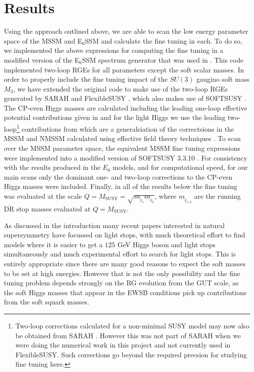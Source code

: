 \documentclass[preprint,amsmath,amssymb,aps,superscriptaddress,prd,
showpacs,floatfix,nofootinbib]{revtex4-1}
\begin{document}
\section{\label{sec:results}Results}

Using the approach outlined above, we are able to scan the low energy
parameter space of the MSSM and E$_6$SSM and calculate the fine tuning
in each.  To do so, we implemented the above expressions for computing
the fine tuning in a modified version of the E$_6$SSM spectrum
generator that was used in \cite{Athron:2013ipa}.  This code
implemented two-loop RGEs for all parameters except the soft scalar
masses.  In order to properly include the fine tuning impact of the
$SU(3)$ gaugino soft mass $M_3$, we have extended the original code to
make use of the two-loop RGEs generated by SARAH \cite{Staub:2009bi,
  Staub:2010jh, Staub:2012pb, Staub:2013tta} and FlexibleSUSY
\cite{Athron:2014yba}, which also makes use of SOFTSUSY
\cite{Allanach:2001kg, Allanach:2013kza}.  The CP-even Higgs masses
are calculated including the leading one-loop effective potential
contributions given in \cite{Athron:2009bs} and for the light Higgs we
use the leading two-loop\footnote{Two-loop corrections calculated for
  a non-minimal SUSY model may now also be obtained from SARAH
  \cite{Goodsell:2014pla,Goodsell:2015ira}.  However this was not part
  of SARAH when we were doing the numerical work in this project and
  not currently used in FlexibleSUSY.  Such corrections go beyond the
  required precsion for studying fine tuning here.} contributions from \cite{King:2005jy} which
are a generalsiation of the correctsions in the MSSM and NMSSM
calculated using effective field theory techniques
\cite{Carena:1995wu,Ellwanger:1999ji}.  To scan over the MSSM
parameter space, the equivalent MSSM fine tuning expressions were
implemented into a modified version of SOFTSUSY 3.3.10
\cite{Allanach:2001kg}.  For consistency with the results produced in
the $E_6$ models, and for computational speed, for our main scans only
the dominant one- and two-loop corrections to the CP-even Higgs masses
were included.  Finally, in all of the results below the fine tuning
was evaluated at the scale $Q = M_{\textrm{SUSY}} =
\sqrt{m_{\tilde{t}_1}m_{\tilde{t}_2}}$, where $m_{\tilde{t}_{1,2}}$
are the running $\overline{\textrm{DR}}$ stop masses evaluated at $Q =
M_{\textrm{SUSY}}$.

As discussed in the introduction many recent papers interested in
natural supersymmetry have focussed on light stops, with much
theoretical effort to find models where it is easier to get a $125$
GeV Higgs boson and light stops simultaneously and much experimental
effort to search for light stops.  This is entirely appropriate since
there are many good reasons to expect the soft masses to be set at
high energies.  However that is not the only possibility and the fine
tuning problem depends strongly on the RG evolution from the GUT
scale, as the soft Higgs masses that appear in the EWSB conditions
pick up contributions from the soft squark masses.
\end{document}
